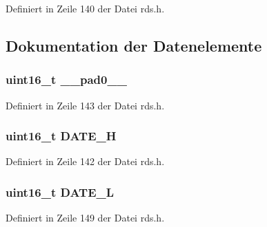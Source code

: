Definiert in Zeile 140 der Datei rds.\+h.



\subsection{Dokumentation der Datenelemente}
\hypertarget{structgroup__4a_a77132c2c26a75f5b8751b235cda23828}{}
\subsubsection[{\+\_\+\+\_\+pad0\+\_\+\+\_\+}]{\setlength{\rightskip}{0pt plus 5cm}uint16\+\_\+t \+\_\+\+\_\+pad0\+\_\+\+\_\+}\label{structgroup__4a_a77132c2c26a75f5b8751b235cda23828}


Definiert in Zeile 143 der Datei rds.\+h.

\hypertarget{structgroup__4a_a3e79884699012bd2127da5d0d474072b}{}
\subsubsection[{D\+A\+T\+E\+\_\+\+H}]{\setlength{\rightskip}{0pt plus 5cm}uint16\+\_\+t D\+A\+T\+E\+\_\+\+H}\label{structgroup__4a_a3e79884699012bd2127da5d0d474072b}


Definiert in Zeile 142 der Datei rds.\+h.

\hypertarget{structgroup__4a_a41f1477fa1205c5f2c4135c43419f931}{}
\subsubsection[{D\+A\+T\+E\+\_\+\+L}]{\setlength{\rightskip}{0pt plus 5cm}uint16\+\_\+t D\+A\+T\+E\+\_\+\+L}\label{structgroup__4a_a41f1477fa1205c5f2c4135c43419f931}


Definiert in Zeile 149 der Datei rds.\+h.

\hypertarget{structgroup__4a_a66d4119990dc4c3e040a43885e9bb953}{}
